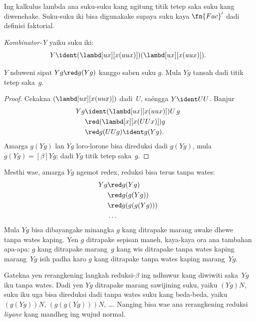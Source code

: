 \documentclass[../../../include/open-logic-section]{subfiles}
\begin{document}
Ing kalkulus lambda ana suku-suku kang ngitung titik tetep
saka suku kang diwenehake. Suku-suku iki bisa digunakake
supaya suku kaya $\fn{Fac}'$ dadi definisi faktorial.

\begin{defn}
  \emph{Kombinator-Y} yaiku suku iki:
  \[
  Y \ident (\lambd[ux][x(uux)])(\lambd[ux][x(uux)]).
  \]
\end{defn}

\begin{thm}
  $Y$ nduweni sipat $Yg \red g(Yg)$ kanggo saben suku $g$.
  Mula $Yg$ tansah dadi titik tetep saka~$g$.
\end{thm}

\begin{proof}
  Cekakna $(\lambd[ux][x(uux)])$ dadi~$U$, saéngga $Y \ident UU$. Banjur
  \begin{align*}
    Y g &\ident (\lambd[ux][x(uux)])U\,g \\
    &\red (\lambd[x][x(UUx)])g\\
    & \red g(UUg) \ident g(Yg).
  \end{align*}
  Amarga $g(Yg)$ lan $Yg$ loro-lorone bisa direduksi dadi $g(Yg)$,
  mula $g(Yg) \equal[\beta] Yg$; dadi $Yg$ titik tetep saka~$g$.
\end{proof}

Mesthi wae, amarga $Yg$ ngemot redex, reduksi bisa terus tanpa wates:
\begin{align*}
  Y g &\red g (Y g) \\
    &\red g (g (Y g)) \\
    &\red g(g (g (Y g)))\\
    &\ldots
\end{align*}
Mula $Yg$ bisa dibayangake minangka $g$ kang ditrapake marang
awake dhewe tanpa wates kaping. Yen $g$ ditrapake sepisan maneh,
kaya-kaya ora ana tambahan apa-apa: $g$ kang ditrapake marang~$g$
kang wis ditrapake tanpa wates kaping marang~$Yg$ isih padha karo
$g$ kang ditrapake tanpa wates kaping marang~$Yg$.

Gatekna yen rerangkening langkah reduksi-$\beta$ ing ndhuwur kang
diwiwiti saka~$Yg$ iku tanpa wates. Dadi yen $Yg$ ditrapake marang
sawijining suku, yaiku $(Yg)N$, suku iku uga bisa direduksi dadi
tanpa wates suku kang beda-beda, yaiku $(g(Yg))N$,
$(g(g(Yg)))N$, \dots. Nanging bisa wae ana rerangkening reduksi
\emph{liyane} kang mandheg ing wujud normal.
\end{document}
